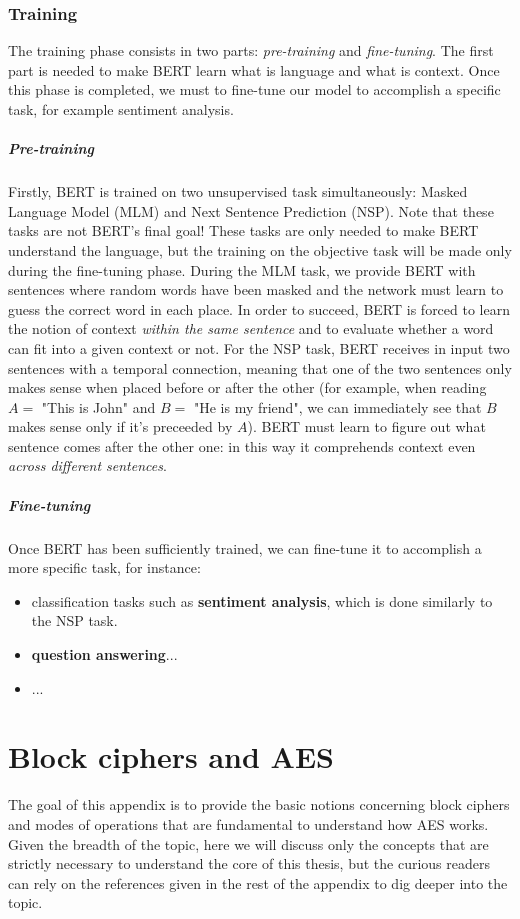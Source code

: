 \documentclass[12pt,a4paper]{book}
\theoremstyle{definition}
\begin{document}
	\subsection{Training}
	The training phase consists in two parts: \textit{pre-training} and \textit{fine-tuning}. The first part is needed to make BERT learn what is language and what is context. Once this phase is completed, we must to fine-tune our model to accomplish a specific task, for example sentiment analysis. 
	
	\paragraph{Pre-training} Firstly, BERT is trained on two unsupervised task simultaneously: Masked Language Model (MLM) and Next Sentence Prediction (NSP). Note that these tasks are not BERT's final goal! These tasks are only needed to make BERT understand the language, but the training on the objective task will be made only during the fine-tuning phase.
	During the MLM task, we provide BERT with sentences where random words have been masked and the network must learn to guess the correct word in each place. In order to succeed, BERT is forced to learn the notion of context \textit{within the same sentence} and to evaluate whether a word can fit into a given context or not. For the NSP task,  BERT receives in input two sentences with a temporal connection, meaning that one of the two sentences only makes sense when placed before or after the other (for example, when reading $A =$ "This is John" and $B =$ "He is my friend", we can immediately see that $B$ makes sense only if it's preceeded by $A$). BERT must learn to figure out what sentence comes after the other one: in this way it comprehends context even \textit{across different sentences}.
	\paragraph{Fine-tuning} Once BERT has been sufficiently trained, we can fine-tune it to accomplish a more specific task, for instance:
	\begin{itemize}
		\item classification tasks such as \textbf{sentiment analysis}, which is done similarly to the NSP task.
		\item \textbf{question answering}...
		\item ...
	\end{itemize}
	
	\chapter{Block ciphers and AES}\label{appendix:aes}
	The goal of this appendix is to provide the basic notions concerning block ciphers and modes of operations that are fundamental to understand how AES works. Given the breadth of the topic, here we will discuss only the concepts that are strictly necessary to understand the core of this thesis, but the curious readers can rely on the references given in the rest of the appendix to dig deeper into the topic.
	
\end{document}
